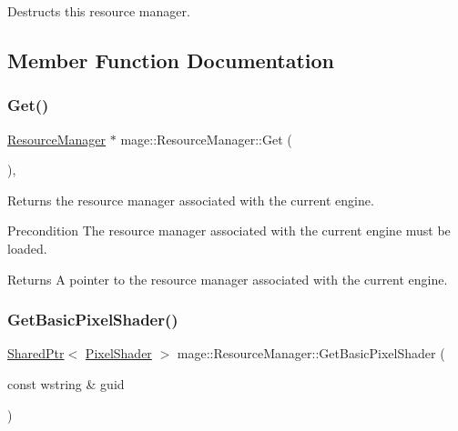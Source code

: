 Destructs this resource manager. 

\subsection{Member Function Documentation}
\hypertarget{classmage_1_1_resource_manager_a1e6ca77d892578fc4df0e62dfbc807f6}{}\label{classmage_1_1_resource_manager_a1e6ca77d892578fc4df0e62dfbc807f6} 
\subsubsection{\texorpdfstring{Get()}{Get()}}
{\footnotesize\ttfamily \hyperlink{classmage_1_1_resource_manager}{Resource\+Manager} $\ast$ mage\+::\+Resource\+Manager\+::\+Get (\begin{DoxyParamCaption}{ }\end{DoxyParamCaption})\hspace{0.3cm}{\ttfamily [static]}, {\ttfamily [noexcept]}}

Returns the resource manager associated with the current engine.

\begin{DoxyPrecond}{Precondition}
The resource manager associated with the current engine must be loaded. 
\end{DoxyPrecond}
\begin{DoxyReturn}{Returns}
A pointer to the resource manager associated with the current engine. 
\end{DoxyReturn}
\hypertarget{classmage_1_1_resource_manager_a68ad57f1d907c348540f94810e7b3fe0}{}\label{classmage_1_1_resource_manager_a68ad57f1d907c348540f94810e7b3fe0} 
\subsubsection{\texorpdfstring{Get\+Basic\+Pixel\+Shader()}{GetBasicPixelShader()}}
{\footnotesize\ttfamily \hyperlink{namespacemage_a1e01ae66713838a7a67d30e44c67703e}{Shared\+Ptr}$<$ \hyperlink{classmage_1_1_pixel_shader}{Pixel\+Shader} $>$ mage\+::\+Resource\+Manager\+::\+Get\+Basic\+Pixel\+Shader (\begin{DoxyParamCaption}\item[{const wstring \&}]{guid }\end{DoxyParamCaption})\hspace{0.3cm}{\ttfamily [noexcept]}}

